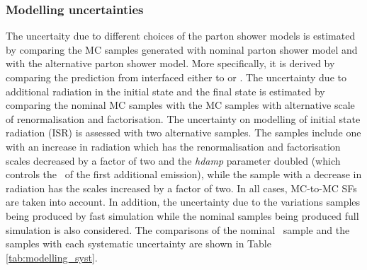 \documentclass[letterpaper,12pt]{article}
\begin{document}
\subsubsection{Modelling uncertainties} 
The uncertaity due to different choices of the parton shower models is estimated by comparing
the MC samples generated with nominal parton shower model and with the 
alternative parton shower model.
More specifically, it is derived 
by comparing the prediction from \powheg interfaced either to \pythia or \Herwigpp. 
The uncertainty due to additional radiation in 
the initial state and the final state is estimated by comparing the nominal MC samples with the MC samples 
with alternative scale of renormalisation and factorisation.
The uncertainty on modelling of initial state radiation (ISR) is assessed with two alternative \powhegpythia 
samples. The samples include one with an increase in radiation which has the renormalisation and 
factorisation scales decreased by a factor of two and the \textit{hdamp} parameter doubled 
(which controls the \pt\ of the first additional emission), while 
the sample with a decrease in radiation has the scales increased by a factor of two. 
In all cases, MC-to-MC SFs are taken into account.
In addition, the uncertainty due to the
variations samples being produced by fast simulation while the nominal samples being 
produced full simulation is also considered.
The comparisons of 
the nominal \ttbar\ sample and the samples with each systematic uncertainty 
are shown in Table \ref{tab:modelling_syst}. 
\end{document}
